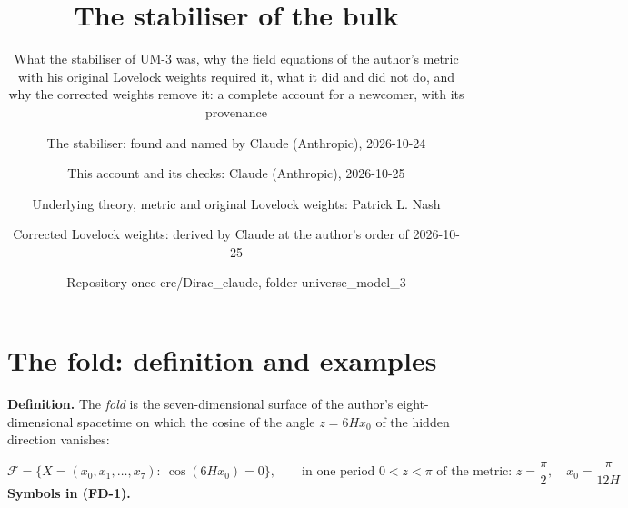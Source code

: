 \documentclass[
  10pt,
]{article}
\title{The stabiliser of the bulk}
\subtitle{What the stabiliser of UM-3 was, why the field equations of
the author's metric with his original Lovelock weights required it, what
it did and did not do, and why the corrected weights remove it: a
complete account for a newcomer, with its provenance}
\author{The stabiliser: found and named by Claude (Anthropic),
2026-10-24 \and This account and its checks: Claude (Anthropic),
2026-10-25 \and Underlying theory, metric and original Lovelock weights:
Patrick L. Nash \and Corrected Lovelock weights: derived by Claude at
the author's order of 2026-10-25 \and Repository once-ere/Dirac\_claude,
folder universe\_model\_3}
\date{}
\begin{document}
\maketitle

{
\hypersetup{linkcolor=}
\setcounter{tocdepth}{3}
\tableofcontents
}
\hypertarget{the-fold-definition-and-examples}{%
\section{The fold: definition and
examples}\label{the-fold-definition-and-examples}}

\textbf{Definition.} The \emph{fold} is the seven-dimensional surface of
the author's eight-dimensional spacetime on which the cosine of the
angle \(z = 6Hx_0\) of the hidden direction vanishes:

\[
\mathcal{F} = \big\{X = (x_0, x_1, \dots, x_7):\ \cos(6Hx_0) = 0\big\},\qquad
\text{in one period } 0 < z < \pi\text{ of the metric: } z = \frac{\pi}{2},\quad x_0 = \frac{\pi}{12H} \tag{FD-1}
\] \textbf{Symbols in (FD-1).}
\end{document}

